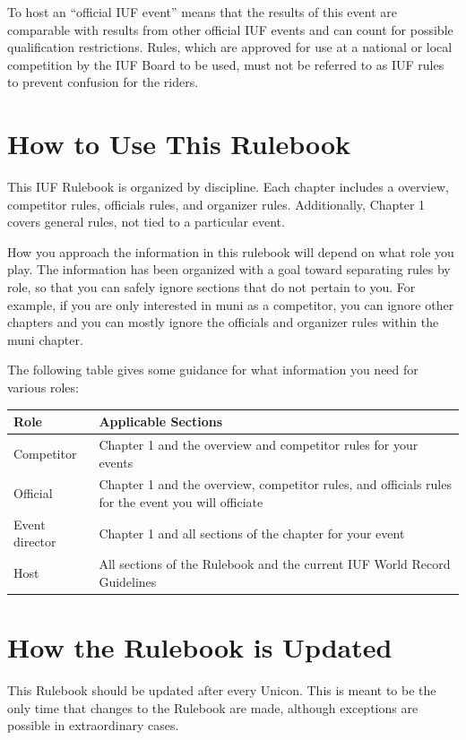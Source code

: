 To host an ``official IUF event'' means that the results of this event are comparable with results from other official IUF events and can count for possible qualification restrictions.
Rules, which are approved for use at a national or local competition by the IUF Board to be used, must not be referred to as IUF rules to prevent confusion for the riders.

\section{How to Use This Rulebook}

This IUF Rulebook is organized by discipline.
Each chapter includes a overview, competitor rules, officials rules, and organizer rules.
Additionally, Chapter 1 covers general rules, not tied to a particular event.

How you approach the information in this rulebook will depend on what role you play.
The information has been organized with a goal toward separating rules by role, so that you can safely ignore sections that do not pertain to you.
For example, if you are only interested in muni as a competitor, you can ignore other chapters and you can mostly ignore the officials and organizer rules within the muni chapter.

The following table gives some guidance for what information you need for various roles:

\begin{longtable}{|l|p{8cm}|}
\hline
\textbf{Role} & \textbf{Applicable Sections} \\
\hline
Competitor & Chapter 1 and the overview and competitor rules for your events\\
\hline
Official & Chapter 1 and the overview, competitor rules, and officials rules for the event you will officiate\\
\hline
Event director & Chapter 1 and all sections of the chapter for your event \\
\hline
Host & All sections of the Rulebook and the current IUF World Record Guidelines\\
\hline
\end{longtable}

\section{How the Rulebook is Updated}

This Rulebook should be updated after every Unicon.
This is meant to be the only time that changes to the Rulebook are made, although exceptions are possible in extraordinary cases.


